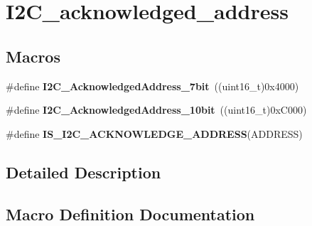 \hypertarget{group___i2_c__acknowledged__address}{}\section{I2\+C\+\_\+acknowledged\+\_\+address}
\label{group___i2_c__acknowledged__address}
\subsection*{Macros}
\begin{DoxyCompactItemize}
\item 
\hypertarget{group___i2_c__acknowledged__address_ga5e5ad2148f9da14457c7b59357acee97}{}\#define {\bfseries I2\+C\+\_\+\+Acknowledged\+Address\+\_\+7bit}~((uint16\+\_\+t)0x4000)\label{group___i2_c__acknowledged__address_ga5e5ad2148f9da14457c7b59357acee97}

\item 
\hypertarget{group___i2_c__acknowledged__address_gaf0bb8f71795f046ad9f6c1fc7fe0fc53}{}\#define {\bfseries I2\+C\+\_\+\+Acknowledged\+Address\+\_\+10bit}~((uint16\+\_\+t)0x\+C000)\label{group___i2_c__acknowledged__address_gaf0bb8f71795f046ad9f6c1fc7fe0fc53}

\item 
\#define {\bfseries I\+S\+\_\+\+I2\+C\+\_\+\+A\+C\+K\+N\+O\+W\+L\+E\+D\+G\+E\+\_\+\+A\+D\+D\+R\+E\+S\+S}(A\+D\+D\+R\+E\+S\+S)
\end{DoxyCompactItemize}


\subsection{Detailed Description}


\subsection{Macro Definition Documentation}
\hypertarget{group___i2_c__acknowledged__address_ga26a3af0a468f7226ed72fde27528c0ba}{}
